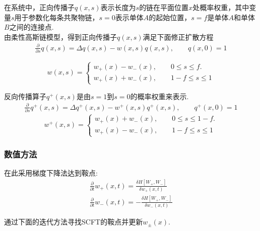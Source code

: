 \documentclass[12pt]{article}
\begin{document}
\begin{CJK}{UTF8}{gkai}
    在系统中，正向传播子$q(x,s)$表示长度为$s$的链在平面位置$x$处概率权重，其中变量$s$用于参数化每条共聚物链，$s=0$表示单体$A$的起始位置，$s=f$是单体$A$和单体$B$之间的连接点.\\
    
    由柔性高斯链模型，得到正向传播子$q(x,s)$满足下面修正扩散方程\\
    
    \begin{gather}
    \frac{\partial}{\partial s}q(x,s)=\Delta q(x,s)-w(x,s)q(x,s),\qquad q(x,0)=1   
    \end{gather} 
      
    \begin{equation}\label{eq:dirichlet}
    w(x,s)=\begin{cases}
    w_+(x)-w_-(x),\qquad 0\leq s \leq f.\\
    w_+(x)+w_-(x),\qquad 1-f\leq s \leq 1 
    \end{cases}
    \end{equation}
    

    反向传播算子$q^{+}(x,s)$是由$s=1$到$s=0$的概率权重来表示.\\
    
   \begin{gather} 
   \frac{\partial}{\partial s}q^{+}(x,s)=\Delta q^{+}(x,s)-w^{+}(x,s)q^{+}(x,s),\qquad q^{+}(x,0)=1 \end{gather}
    \begin{equation}\label{eq:dirichlet}
    w^{+}(x,s)=\begin{cases}
    w_+(x)+w_-(x),\qquad 0\leq s \leq 1-f.\\
    w_+(x)-w_-(x),\qquad 1-f\leq s \leq 1 
    \end{cases}
    \end{equation}
    \subsubsection{数值方法}
    
         在此采用梯度下降法达到鞍点:\\
         
    \begin{gather}    
    \frac{\partial}{\partial t}w_+(x,t)=\frac{\delta H[W_+,W_-]}{\delta w_+(x,t)}\\
    \frac{\partial}{\partial t}w_-(x,t)=-\frac{\delta H[W_+,W_-]}{\delta w_-(x,t)}    
    \end{gather}
    
    
    通过下面的迭代方法寻找SCFT的鞍点并更新$w_{\pm}(x)$.\\
    

\end{CJK}
\end{document}
